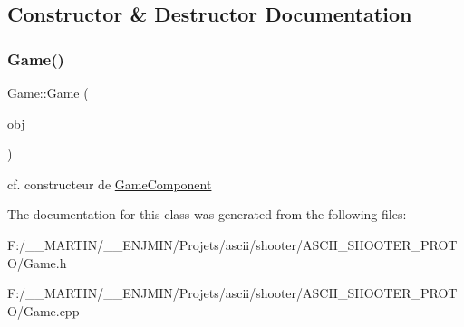 \subsection{Constructor \& Destructor Documentation}
\hypertarget{class_game_a366e0d372a100b7de351caf14cede996}{}\label{class_game_a366e0d372a100b7de351caf14cede996} 
\subsubsection{\texorpdfstring{Game()}{Game()}}
{\footnotesize\ttfamily Game\+::\+Game (\begin{DoxyParamCaption}\item[{\hyperlink{class_game_object}{Game\+Object} $\ast$}]{obj }\end{DoxyParamCaption})}

cf. constructeur de \hyperlink{class_game_component}{Game\+Component} 

The documentation for this class was generated from the following files\+:\begin{DoxyCompactItemize}
\item 
F\+:/\+\_\+\+\_\+\+M\+A\+R\+T\+I\+N/\+\_\+\+\_\+\+E\+N\+J\+M\+I\+N/\+Projets/ascii/shooter/\+A\+S\+C\+I\+I\+\_\+\+S\+H\+O\+O\+T\+E\+R\+\_\+\+P\+R\+O\+T\+O/Game.\+h\item 
F\+:/\+\_\+\+\_\+\+M\+A\+R\+T\+I\+N/\+\_\+\+\_\+\+E\+N\+J\+M\+I\+N/\+Projets/ascii/shooter/\+A\+S\+C\+I\+I\+\_\+\+S\+H\+O\+O\+T\+E\+R\+\_\+\+P\+R\+O\+T\+O/Game.\+cpp\end{DoxyCompactItemize}
